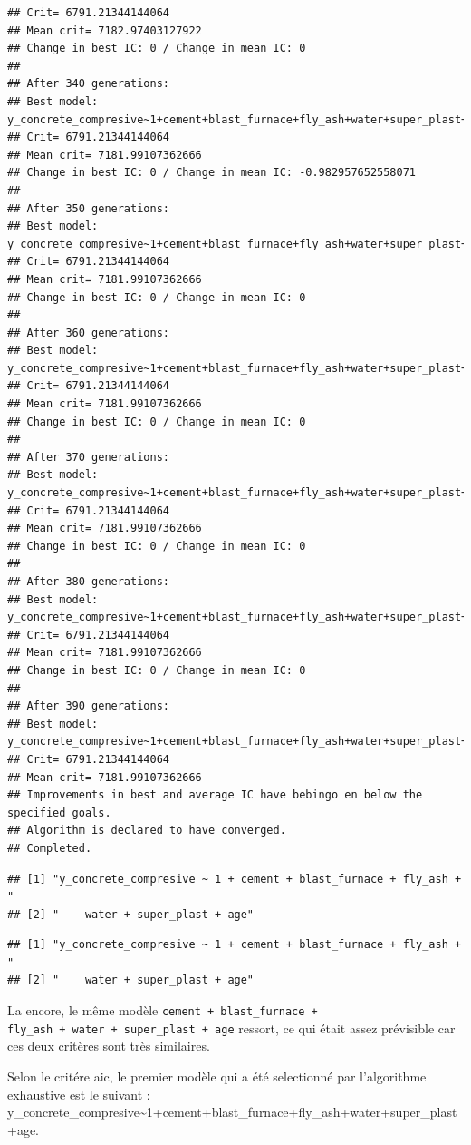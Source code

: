 \documentclass[
  12pt,
]{article}
\begin{document}
\begin{verbatim}
## Crit= 6791.21344144064
## Mean crit= 7182.97403127922
## Change in best IC: 0 / Change in mean IC: 0
## 
## After 340 generations:
## Best model: y_concrete_compresive~1+cement+blast_furnace+fly_ash+water+super_plast+age
## Crit= 6791.21344144064
## Mean crit= 7181.99107362666
## Change in best IC: 0 / Change in mean IC: -0.982957652558071
## 
## After 350 generations:
## Best model: y_concrete_compresive~1+cement+blast_furnace+fly_ash+water+super_plast+age
## Crit= 6791.21344144064
## Mean crit= 7181.99107362666
## Change in best IC: 0 / Change in mean IC: 0
## 
## After 360 generations:
## Best model: y_concrete_compresive~1+cement+blast_furnace+fly_ash+water+super_plast+age
## Crit= 6791.21344144064
## Mean crit= 7181.99107362666
## Change in best IC: 0 / Change in mean IC: 0
## 
## After 370 generations:
## Best model: y_concrete_compresive~1+cement+blast_furnace+fly_ash+water+super_plast+age
## Crit= 6791.21344144064
## Mean crit= 7181.99107362666
## Change in best IC: 0 / Change in mean IC: 0
## 
## After 380 generations:
## Best model: y_concrete_compresive~1+cement+blast_furnace+fly_ash+water+super_plast+age
## Crit= 6791.21344144064
## Mean crit= 7181.99107362666
## Change in best IC: 0 / Change in mean IC: 0
## 
## After 390 generations:
## Best model: y_concrete_compresive~1+cement+blast_furnace+fly_ash+water+super_plast+age
## Crit= 6791.21344144064
## Mean crit= 7181.99107362666
## Improvements in best and average IC have bebingo en below the specified goals.
## Algorithm is declared to have converged.
## Completed.
\end{verbatim}

\begin{verbatim}
## [1] "y_concrete_compresive ~ 1 + cement + blast_furnace + fly_ash + "
## [2] "    water + super_plast + age"
\end{verbatim}

\begin{verbatim}
## [1] "y_concrete_compresive ~ 1 + cement + blast_furnace + fly_ash + "
## [2] "    water + super_plast + age"
\end{verbatim}

La encore, le même modèle \texttt{cement\ +\ blast\_furnace\ +}
\texttt{fly\_ash\ +\ water\ +\ super\_plast\ +\ age} ressort, ce qui
était assez prévisible car ces deux critères sont très similaires.

Selon le critére aic, le premier modèle qui a été selectionné par
l'algorithme exhaustive est le suivant :
y\_concrete\_compresive\textasciitilde1+cement+blast\_furnace+fly\_ash+water+super\_plast+age.
\end{document}
